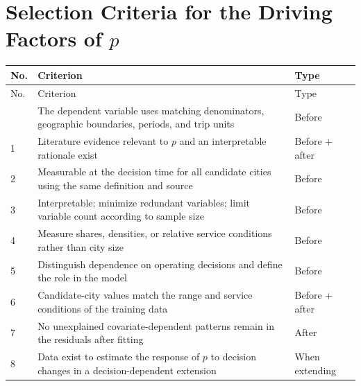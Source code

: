 \documentclass[10pt,a4paper]{article}
\begin{document}
\section{Selection Criteria for the Driving Factors of $p$}
{\small
\begin{longtable}{@{}L{0.07\textwidth}L{0.72\textwidth}L{0.15\textwidth}@{}}
\toprule No. & Criterion & Type\\\midrule\endfirsthead
\toprule No. & Criterion & Type\\\midrule\endhead\bottomrule{} & The dependent variable uses matching denominators, geographic boundaries, periods, and trip units & Before\\
1 & Literature evidence relevant to $p$ and an interpretable rationale exist & Before + after\\
2 & Measurable at the decision time for all candidate cities using the same definition and source & Before\\
3 & Interpretable; minimize redundant variables; limit variable count according to sample size & Before\\
4 & Measure shares, densities, or relative service conditions rather than city size & Before\\
5 & Distinguish dependence on operating decisions and define the role in the model & Before\\
6 & Candidate-city values match the range and service conditions of the training data & Before + after\\
7 & No unexplained covariate-dependent patterns remain in the residuals after fitting & After\\
8 & Data exist to estimate the response of $p$ to decision changes in a decision-dependent extension & When extending\\
\end{longtable}}
\end{document}
